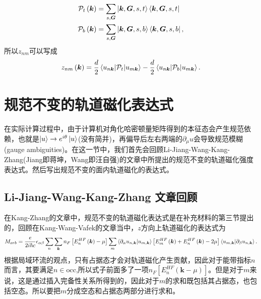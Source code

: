 \documentclass[10pt, oneside]{article}
\newcommand{\pa}{\partial}
\newcommand{\mr}[1]{\mathrm{#1}}
\newcommand{\p}[1]{\left(#1\right)}
\newcommand{\bb}[1]{\left[#1\right]}
\begin{document}
\begin{align}
	\begin{split}
		\mathcal{P}_{t} \p{\bm{k}} & = \sum_{s, \bm{G}} \ket{\bm{k}, \bm{G}, s, t} \bra{\bm{k}, \bm{G}, s, t} \\
		\mathcal{P}_{b} \p{\bm{k}} & = \sum_{s, \bm{G}} \ket{\bm{k}, \bm{G}, s, b} \bra{\bm{k}, \bm{G}, s, b},
	\end{split}
\end{align}
所以\(z_{nm}\)可以写成
\begin{align}
	z_{nm} \p{\bm{k}} = \frac{d}{2} \braket{u_{n \bm{k}} | \mathcal{P}_t | u_{m \bm{k}}} - \frac{d}{2} \braket{u_{n \bm{k}} | \mathcal{P}_b | u_{m \bm{k}}}.
\end{align}

\section{规范不变的轨道磁化表达式}
在实际计算过程中，由于计算机对角化哈密顿量矩阵得到的本征态会产生规范依赖，也就是\(\ket{u} \rightarrow e^{i \theta} \ket{u}\)(没有简并)，再偏导后左右两端的\(\pa_{\mu} u\)会导致规范模糊(gauge ambiguities)。在这一节中，我们首先会回顾Li-Jiang-Wang-Kang-Zhang(Jiang即蒋坤，Wang即汪自强)的文章中所提出的规范不变的轨道磁化强度表达式。然后写出规范不变的面内轨道磁化的表达式。

\subsection{Li-Jiang-Wang-Kang-Zhang 文章回顾}
在Kang-Zhang的文章中，规范不变的轨道磁化表达式是在补充材料的第三节提出的，回顾在Kang-Wang-Vafek的文章当中，\(z\)方向上轨道磁化的表达式为
\begin{align}
	M_{orb} = \frac{e}{2 i \hbar c} \epsilon_{\alpha \beta} \sum_{n} \sum_{\bm{k}} n_{F} \bb{E^{HF}_{n} \p{\bm{k}}  - \mu } \sum_{m} \braket{\pa_\alpha u_{n, \bm{k}} |u_{m , \bm{k}}} \bb{E^{HF}_{m}\p{\bm{k}} +E^{HF}_{n}\p{\bm{k}} - 2 \mu} \braket{u_{m, \bm{k}} | \pa_\beta u_{n, \bm{k}}}.
\end{align}
根据局域环流的观点，只有占据态才会对轨道磁化产生贡献，因此对于能带指标\(n\)而言，其要满足\(n \in \mr{occ}\),所以式子前面多了一项\(n_{F} \bb{E^{HF}_{n} \p{\bm{k} - \mu}}\)。但是对于\(m\)来说，这是通过插入完备性关系所得到的，因此对于\(m\)的求和既包括其占据态，也包括空态。所以要把\(m\)分成空态和占据态两部分进行求和。
\end{document}
